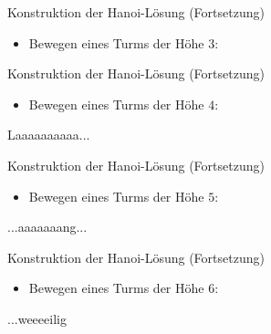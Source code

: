 \begin{fframe}
\begin{block}{Konstruktion der Hanoi-Lösung (Fortsetzung)}
	\begin{itemize}
	\item Bewegen eines Turms der Höhe $3$:
	\end{itemize}
\end{block}
\begin{block}{}
\end{block}
\end{fframe}

\begin{fframe}
\begin{block}{Konstruktion der Hanoi-Lösung (Fortsetzung)}
	\begin{itemize}
	\item Bewegen eines Turms der Höhe $4$:
	\end{itemize}
\end{block}
\begin{block}{Laaaaaaaaaa...}
\end{block}
\end{fframe}

\begin{fframe}
	\begin{block}{Konstruktion der Hanoi-Lösung (Fortsetzung)}
		\begin{itemize}
		\item Bewegen eines Turms der Höhe $5$:
		\end{itemize}
	\end{block}
	\begin{block}{...aaaaaaang...}
	\end{block}
\end{fframe}

\begin{fframe}
	\begin{block}{Konstruktion der Hanoi-Lösung (Fortsetzung)}
		\begin{itemize}
		\item Bewegen eines Turms der Höhe $6$:
		\end{itemize}
	\end{block}
	\begin{block}{...weeeeilig}
	\end{block}
	\end{fframe}

